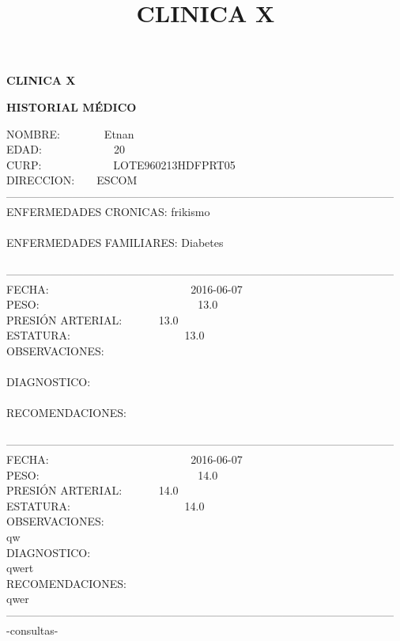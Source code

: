 \documentclass[10pt,a4paper]{letter}
\title{\bf CLINICA X}
\begin{document}
\begin{center}
{\scshape\LARGE \bf CLINICA X\par}
{\bf HISTORIAL MÉDICO\\}
\end{center}
NOMBRE:\ \ \ \ \ \ \ \ Etnan\\
EDAD:\ \ \ \ \ \ \ \ \ \ \ \ \ 20\\
CURP:\ \ \ \ \ \ \ \ \ \ \ \ \ LOTE960213HDFPRT05 \\
DIRECCION:\ \ \ \ ESCOM\\
--------------------------------------------------------------------------------------------------------- \\
ENFERMEDADES CRONICAS: frikismo\\ \\
ENFERMEDADES FAMILIARES: Diabetes \\ \\
--------------------------------------------------------------------------------------------------------- \\
FECHA: \ \ \ \ \ \ \ \ \ \ \ \ \ \ \ \ \ \ \ \ \ \ \ \ \ 2016-06-07 \\
PESO: \ \ \ \ \ \ \ \ \ \ \ \ \ \ \ \ \ \ \ \ \ \ \ \ \ \ \ \ 13.0 \\
PRESIÓN ARTERIAL: \ \ \ \ \ \ 13.0 \\
ESTATURA: \ \ \ \ \ \ \ \ \ \ \ \ \ \ \ \ \ \ \ \ 13.0\\
OBSERVACIONES:\\
\\
DIAGNOSTICO:\\
\\
RECOMENDACIONES:\\
\\
--------------------------------------------------------------------------------------------------------- \\
FECHA: \ \ \ \ \ \ \ \ \ \ \ \ \ \ \ \ \ \ \ \ \ \ \ \ \ 2016-06-07 \\
PESO: \ \ \ \ \ \ \ \ \ \ \ \ \ \ \ \ \ \ \ \ \ \ \ \ \ \ \ \ 14.0 \\
PRESIÓN ARTERIAL: \ \ \ \ \ \ 14.0 \\
ESTATURA: \ \ \ \ \ \ \ \ \ \ \ \ \ \ \ \ \ \ \ \ 14.0\\
OBSERVACIONES:\\
qw\\
DIAGNOSTICO:\\
qwert\\
RECOMENDACIONES:\\
qwer\\
--------------------------------------------------------------------------------------------------------- \\
-consultas-
\end{document}
